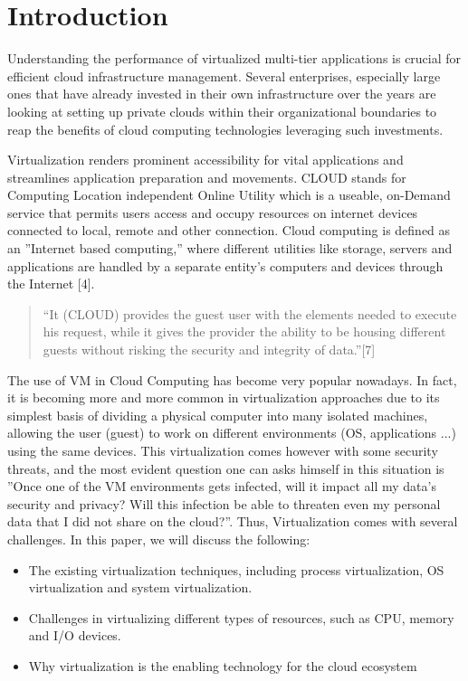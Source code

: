 \section{Introduction}


Understanding the performance of virtualized multi-tier applications is crucial for efficient cloud infrastructure management. Several enterprises, especially large ones that have already invested in their own infrastructure over the years are looking at setting up private clouds within their organizational boundaries 
to reap the benefits of cloud computing technologies leveraging such investments. 

Virtualization renders prominent accessibility for vital applications and streamlines application preparation and movements. CLOUD stands for Computing Location independent Online Utility which is a useable, on-Demand service that permits users access and occupy resources on internet devices connected to local, remote and other connection. Cloud computing is defined as an ''Internet based computing,'' where different utilities like storage, servers and applications are handled by a separate entity's computers and devices through the Internet [4]. 

\begin{quote}
  ``It (CLOUD) provides the guest user with the elements needed to execute his request, while it gives the provider the ability to be housing different guests without risking the security and integrity of data.''[7]
\end{quote}
The use of VM in Cloud Computing has become very popular nowadays. In fact, it is becoming more and more common in virtualization approaches due to its simplest basis of dividing a physical computer into many isolated machines, allowing the user (guest) to work on different environments (OS, applications ...) using the same devices. This virtualization comes however with some security threats, and the most evident question one can asks himself in this situation is ''Once one of the VM environments gets infected, will it impact all my data's security and privacy? Will this infection be able to threaten even my personal data that I did not share on the cloud?''. Thus, Virtualization comes with several challenges. In this paper, we will discuss the following:
\begin{itemize}
\item The existing virtualization techniques, including process 
virtualization, OS virtualization and system virtualization.
\item Challenges in virtualizing different types of resources, 
such as CPU, memory and I/O devices.
\item Why virtualization is the enabling technology for the cloud ecosystem
\end{itemize}

